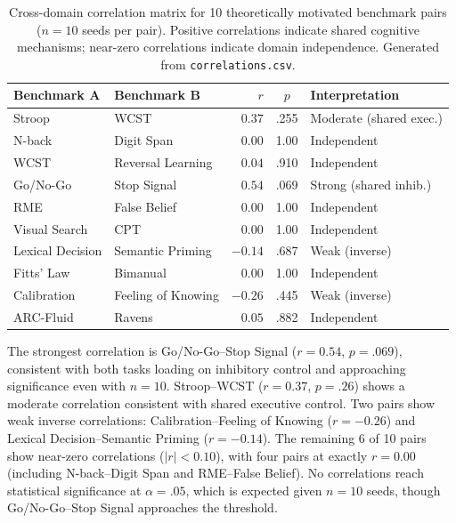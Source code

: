 \documentclass[11pt,letterpaper]{article}
\begin{document}
\begin{table}[t]
\centering
\caption{Cross-domain correlation matrix for 10 theoretically motivated benchmark pairs ($n = 10$ seeds per pair). Positive correlations indicate shared cognitive mechanisms; near-zero correlations indicate domain independence. Generated from \texttt{correlations.csv}.}
\label{tab:correlations}
\small
\begin{tabular}{@{}llrcl@{}}
\toprule
\textbf{Benchmark A} & \textbf{Benchmark B} & \textbf{$r$} & \textbf{$p$} & \textbf{Interpretation} \\
\midrule
Stroop             & WCST               &  $0.37$ & .255 & Moderate (shared exec.) \\
N-back             & Digit Span         &  $0.00$ & 1.00 & Independent \\
WCST               & Reversal Learning  &  $0.04$ & .910 & Independent \\
Go/No-Go           & Stop Signal        &  $0.54$ & .069 & Strong (shared inhib.) \\
RME                & False Belief       &  $0.00$ & 1.00 & Independent \\
Visual Search      & CPT                &  $0.00$ & 1.00 & Independent \\
Lexical Decision   & Semantic Priming   & $-0.14$ & .687 & Weak (inverse) \\
Fitts' Law         & Bimanual           &  $0.00$ & 1.00 & Independent \\
Calibration        & Feeling of Knowing & $-0.26$ & .445 & Weak (inverse) \\
ARC-Fluid          & Ravens             &  $0.05$ & .882 & Independent \\
\bottomrule
\end{tabular}
\end{table}

The strongest correlation is Go/No-Go--Stop Signal ($r = 0.54$, $p = .069$), consistent with both tasks loading on inhibitory control and approaching significance even with $n = 10$. Stroop--WCST ($r = 0.37$, $p = .26$) shows a moderate correlation consistent with shared executive control. Two pairs show weak inverse correlations: Calibration--Feeling of Knowing ($r = -0.26$) and Lexical Decision--Semantic Priming ($r = -0.14$). The remaining 6 of 10 pairs show near-zero correlations ($|r| < 0.10$), with four pairs at exactly $r = 0.00$ (including N-back--Digit Span and RME--False Belief). No correlations reach statistical significance at $\alpha = .05$, which is expected given $n = 10$ seeds, though Go/No-Go--Stop Signal approaches the threshold.
\end{document}
